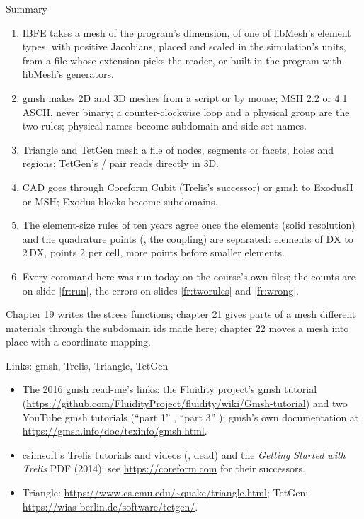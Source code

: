 \documentclass[aspectratio=169,11pt]{beamer}
\begin{document}
\begin{frame}{Summary}
\label{fr:summary}
\footnotesize
\begin{enumerate}
  \item IBFE takes a mesh of the program's dimension, of one of libMesh's element types, with positive Jacobians, placed and scaled in the simulation's units, from a file whose extension picks the reader, or built in the program with libMesh's generators.
  \item gmsh makes 2D and 3D meshes from a script or by mouse; MSH 2.2 or 4.1 ASCII, never binary; a counter-clockwise loop and a physical group are the two rules; physical names become subdomain and side-set names.
  \item Triangle and TetGen mesh a  file of nodes, segments or facets, holes and regions; TetGen's / pair reads directly in 3D.
  \item CAD goes through Coreform Cubit (Trelis's successor) or gmsh to ExodusII or MSH; Exodus blocks become subdomains.
  \item The element-size rules of ten years agree once the elements (solid resolution) and the quadrature points (, the coupling) are separated: elements of $\mathrm{DX}$ to $2\,\mathrm{DX}$, points $2$ per cell, more points before smaller elements.
  \item Every command here was run today on the course's own files; the counts are on slide \ref{fr:run}, the errors on slides \ref{fr:tworules} and \ref{fr:wrong}.
\end{enumerate}
\begin{homebox}
\footnotesize Chapter 19 writes the stress functions; chapter 21 gives parts of a mesh different materials through the subdomain ids made here; chapter 22 moves a mesh into place with a coordinate mapping.
\end{homebox}
\end{frame}

\begin{frame}{Links: gmsh, Trelis, Triangle, TetGen}
\label{fr:links}
\small
\begin{itemize}
  \item The 2016 gmsh read-me's links: the Fluidity project's gmsh tutorial (\url{https://github.com/FluidityProject/fluidity/wiki/Gmsh-tutorial}) and two YouTube gmsh tutorials (``part 1'' , ``part 3'' ); gmsh's own documentation at \url{https://gmsh.info/doc/texinfo/gmsh.html}.
  \item csimsoft's Trelis tutorials and videos (, dead) and the \emph{Getting Started with Trelis} PDF (2014): see \url{https://coreform.com} for their successors.
  \item Triangle: \url{https://www.cs.cmu.edu/~quake/triangle.html}; TetGen: \url{https://wias-berlin.de/software/tetgen/}.
\end{itemize}
\end{frame}
\end{document}
